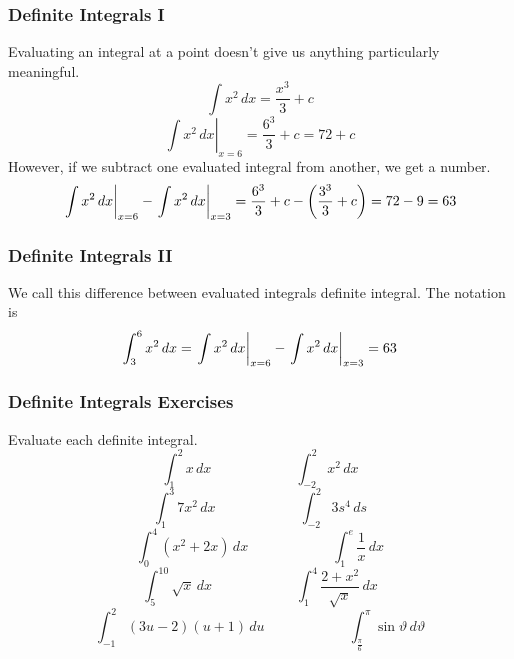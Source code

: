 \documentclass[xcolor=dvipsnames]{beamer}
\begin{document}
\begin{frame}
  \frametitle{Definite Integrals I}
Evaluating an integral at a point doesn't give us anything
particularly meaningful.
\begin{equation}
  \label{eq:beavaika}
  \int{}x^{2}\,dx=\frac{x^{3}}{3}+c
\end{equation}
\begin{equation}
  \label{eq:paeshohz}
  \left.\int{}x^{2}\,dx\right\vert_{x=6}=\frac{6^{3}}{3}+c=72+c
\end{equation}
However, if we subtract one evaluated integral from another, we get a number.
\begin{equation}
  \label{eq:phiasohm}
  \left.\int{}x^{2}\,dx\right\vert_{x=6}-\left.\int{}x^{2}\,dx\right\vert_{x=3}=\frac{6^{3}}{3}+c-\left(\frac{3^{3}}{3}+c\right)=72-9=63\notag
\end{equation}
\end{frame}

\begin{frame}
  \frametitle{Definite Integrals II}
We call this difference between evaluated integrals \alert{definite
  integral}. The notation is
\begin{equation}
  \label{eq:yooxiefi}
  \int_{3}^{6}x^{2}\,dx=\left.\int{}x^{2}\,dx\right\vert_{x=6}-\left.\int{}x^{2}\,dx\right\vert_{x=3}=63\notag
\end{equation}
\end{frame}

\begin{frame}
  \frametitle{Definite Integrals Exercises}
Evaluate each definite integral.
\begin{equation}
  \label{eq:ufaetohm}
  \int_{1}^{2}x\,dx\hspace{1in}  \int_{-2}^{2}x^{2}\,dx
\end{equation}
\begin{equation}
  \label{eq:vahyooyi}
  \int_{1}^{3}7x^{2}\,dx\hspace{1in}  \int_{-2}^{2}3s^{4}\,ds
\end{equation}
\begin{equation}
  \label{eq:wohbuxoo}
  \int_{0}^{4}(x^{2}+2x)\,dx\hspace{1in}  \int_{1}^{e}\frac{1}{x}\,dx
\end{equation}
\begin{equation}
  \label{eq:ohgooquu}
  \int_{5}^{10}\sqrt{x}\,dx\hspace{1in}\int_{1}^{4}\frac{2+x^{2}}{\sqrt{x}}\,dx
\end{equation}
\begin{equation}
  \label{eq:yoocaitu}
  \int_{-1}^{2}(3u-2)(u+1)\,du\hspace{1in}\int_{\frac{\pi}{6}}^{\pi}\sin\vartheta{}\,d\vartheta
\end{equation}
\end{frame}
\end{document}
